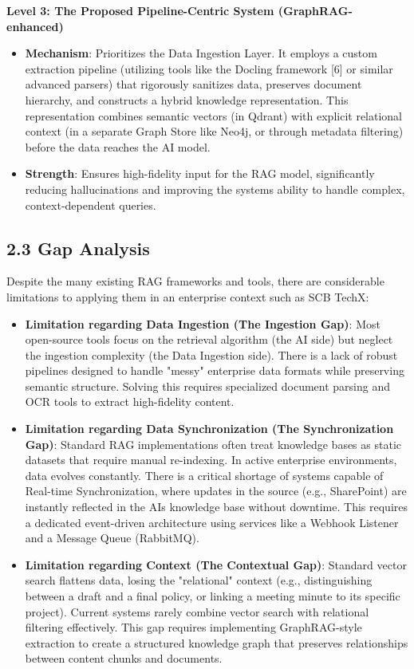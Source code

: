 \documentclass[12pt]{article}
\begin{document}
\textbf{Level 3: The Proposed Pipeline-Centric System
(GraphRAG-enhanced)}

\begin{itemize}
\item
  \textbf{Mechanism}: Prioritizes the Data Ingestion Layer. It employs a
  custom extraction pipeline (utilizing tools like the Docling framework
  {[}6{]} or similar advanced parsers) that rigorously sanitizes data,
  preserves document hierarchy, and constructs a hybrid knowledge
  representation. This representation combines semantic vectors (in
  Qdrant) with explicit relational context (in a separate Graph Store
  like Neo4j, or through metadata filtering) before the data reaches the
  AI model.
\item
  \textbf{Strength}: Ensures high-fidelity input for the RAG model,
  significantly reducing hallucinations and improving the
  system\textquotesingle s ability to handle complex, context-dependent
  queries.
\end{itemize}

\subsection{2.3 Gap Analysis}\label{gap-analysis}

Despite the many existing RAG frameworks and tools, there are
considerable limitations to applying them in an enterprise context such
as SCB TechX:

\begin{itemize}
\item
  \textbf{Limitation regarding Data Ingestion (The Ingestion Gap)}: Most
  open-source tools focus on the retrieval algorithm (the AI side) but
  neglect the ingestion complexity (the Data Ingestion side). There is a
  lack of robust pipelines designed to handle "messy" enterprise data
  formats while preserving semantic structure. Solving this requires
  specialized document parsing and OCR tools to extract high-fidelity
  content.
\item
  \textbf{Limitation regarding Data Synchronization (The Synchronization
  Gap)}: Standard RAG implementations often treat knowledge bases as
  static datasets that require manual re-indexing. In active enterprise
  environments, data evolves constantly. There is a critical shortage of
  systems capable of Real-time Synchronization, where updates in the
  source (e.g., SharePoint) are instantly reflected in the
  AI\textquotesingle s knowledge base without downtime. This requires a
  dedicated event-driven architecture using services like a Webhook
  Listener and a Message Queue (RabbitMQ).
\item
  \textbf{Limitation regarding Context (The Contextual Gap)}: Standard
  vector search flattens data, losing the "relational" context (e.g.,
  distinguishing between a draft and a final policy, or linking a
  meeting minute to its specific project). Current systems rarely
  combine vector search with relational filtering effectively. This gap
  requires implementing GraphRAG-style extraction to create a structured
  knowledge graph that preserves relationships between content chunks
  and documents.
\end{itemize}
\end{document}
